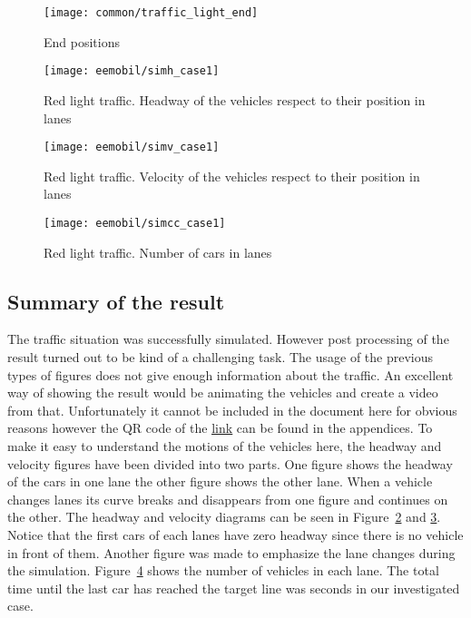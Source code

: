 		\begin{figure}
			\centering
			\texttt{[image: common/traffic\_light\_end]}
			\caption{End positions}
			\label{fig:traffic_light_end}
		\end{figure}
		\begin{figure}
			\centering
			\texttt{[image: eemobil/simh\_case1]}
			\caption{Red light traffic. Headway of the vehicles respect to their position in lanes}
			\label{fig:red_light_situationh}
		\end{figure}
		\begin{figure}
			\centering
			\texttt{[image: eemobil/simv\_case1]}
			\caption{Red light traffic. Velocity of the vehicles respect to their position in lanes}
			\label{fig:red_light_situationv}
		\end{figure}
		\begin{figure}
			\centering
			\texttt{[image: eemobil/simcc\_case1]}
			\caption{Red light traffic. Number of cars in lanes }
			\label{fig:red_light_situationcc}
		\end{figure}
		\subsection*{Summary of the result}
		The traffic situation was successfully simulated. However post processing of the result turned out to be kind of a challenging task. The usage of the previous types of figures does not give enough information about the traffic. An excellent way of showing the result would be animating the vehicles and create a video from that. Unfortunately it cannot be included in the document here for obvious reasons however the QR code of the \href{https://youtu.be/wSFh_gOpIFU}{\underline{link}} can be found in the appendices. To make it easy to understand the motions of the vehicles here, the headway and velocity figures have been divided into two parts. One figure shows the headway of the cars in one lane the other figure shows the other lane. When a vehicle changes lanes its curve breaks and disappears from one figure and continues on the other.
		The headway and velocity diagrams can be seen in Figure~\ref{fig:red_light_situationh} and \ref{fig:red_light_situationv}. Notice that the first cars of each lanes have zero headway since there is no vehicle in front of them. Another figure was made to emphasize the lane changes during the simulation. Figure~\ref{fig:red_light_situationcc} shows the number of vehicles in each lane. The total time until the last car has reached the target line was seconds in our investigated case.

